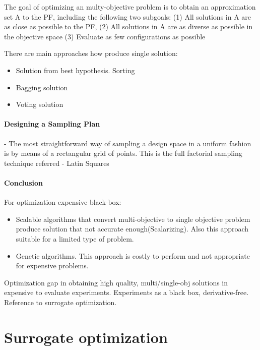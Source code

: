            The goal of optimizing an multy-objective problem is to obtain an approximation set A to the PF, including the following two subgoals:
                (1) All solutions in A are as close as possible to the PF,
                (2) All solutions in A are as diverse as possible in the objective space
                (3) Evaluate as few configurations as possible
        
            There are main approaches how produce single solution: 
            \begin{itemize}
                \item Solution from best hypothesis. Sorting
                \item Bagging solution
                \item Voting solution                
            \end{itemize}
        
            \paragraph{Designing a Sampling Plan}
             - The most straightforward way of sampling a design space in a uniform fashion is by \cite{EngSurMod}
             means of a rectangular grid of points. This is the full factorial sampling technique referred
             - Latin Squares

        \paragraph{Conclusion}
        For optimization expensive black-box:
        \begin{itemize}
            \item Scalable algorithms that convert multi-objective to single objective problem produce solution that not accurate enough(Scalarizing). Also this approach suitable for a limited type of problem.
            \item Genetic algorithms. This approach is costly to perform and not appropriate for expensive problems.
        \end{itemize}
        Optimization gap in obtaining high quality, multi/single-obj solutions in expensive to evaluate experiments.
        Experiments as a black box, derivative-free. Reference to surrogate optimization.

    \section{Surrogate optimization}

